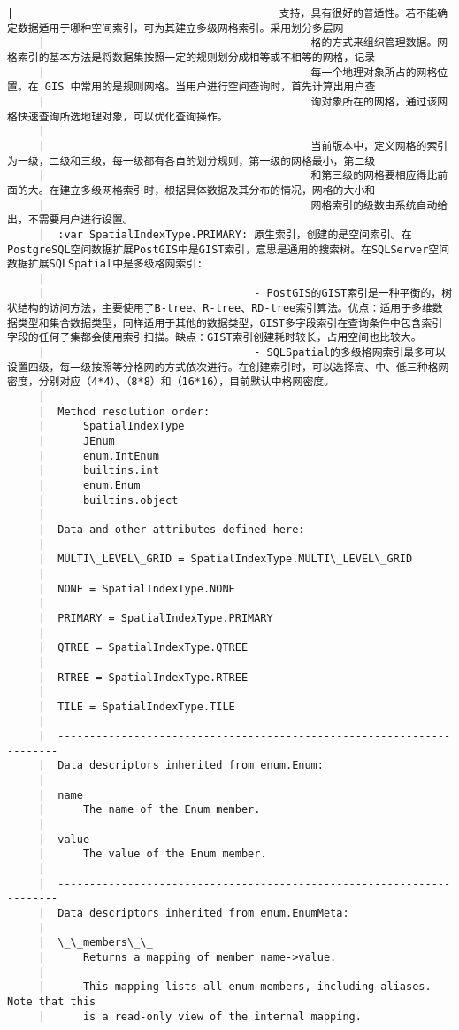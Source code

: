 \documentclass[11pt]{article}
\begin{document}
\begin{Verbatim}[commandchars=\\\{\}]
     |                                          支持，具有很好的普适性。若不能确定数据适用于哪种空间索引，可为其建立多级网格索引。采用划分多层网
     |                                          格的方式来组织管理数据。网格索引的基本方法是将数据集按照一定的规则划分成相等或不相等的网格，记录
     |                                          每一个地理对象所占的网格位置。在 GIS 中常用的是规则网格。当用户进行空间查询时，首先计算出用户查
     |                                          询对象所在的网格，通过该网格快速查询所选地理对象，可以优化查询操作。
     |  
     |                                          当前版本中，定义网格的索引为一级，二级和三级，每一级都有各自的划分规则，第一级的网格最小，第二级
     |                                          和第三级的网格要相应得比前面的大。在建立多级网格索引时，根据具体数据及其分布的情况，网格的大小和
     |                                          网格索引的级数由系统自动给出，不需要用户进行设置。
     |  :var SpatialIndexType.PRIMARY: 原生索引，创建的是空间索引。在PostgreSQL空间数据扩展PostGIS中是GIST索引，意思是通用的搜索树。在SQLServer空间数据扩展SQLSpatial中是多级格网索引:
     |  
     |                                 - PostGIS的GIST索引是一种平衡的，树状结构的访问方法，主要使用了B-tree、R-tree、RD-tree索引算法。优点：适用于多维数据类型和集合数据类型，同样适用于其他的数据类型，GIST多字段索引在查询条件中包含索引字段的任何子集都会使用索引扫描。缺点：GIST索引创建耗时较长，占用空间也比较大。
     |                                 - SQLSpatial的多级格网索引最多可以设置四级，每一级按照等分格网的方式依次进行。在创建索引时，可以选择高、中、低三种格网密度，分别对应（4*4）、（8*8）和（16*16），目前默认中格网密度。
     |  
     |  Method resolution order:
     |      SpatialIndexType
     |      JEnum
     |      enum.IntEnum
     |      builtins.int
     |      enum.Enum
     |      builtins.object
     |  
     |  Data and other attributes defined here:
     |  
     |  MULTI\_LEVEL\_GRID = SpatialIndexType.MULTI\_LEVEL\_GRID
     |  
     |  NONE = SpatialIndexType.NONE
     |  
     |  PRIMARY = SpatialIndexType.PRIMARY
     |  
     |  QTREE = SpatialIndexType.QTREE
     |  
     |  RTREE = SpatialIndexType.RTREE
     |  
     |  TILE = SpatialIndexType.TILE
     |  
     |  ----------------------------------------------------------------------
     |  Data descriptors inherited from enum.Enum:
     |  
     |  name
     |      The name of the Enum member.
     |  
     |  value
     |      The value of the Enum member.
     |  
     |  ----------------------------------------------------------------------
     |  Data descriptors inherited from enum.EnumMeta:
     |  
     |  \_\_members\_\_
     |      Returns a mapping of member name->value.
     |      
     |      This mapping lists all enum members, including aliases. Note that this
     |      is a read-only view of the internal mapping.
    

\end{Verbatim}
\end{document}
